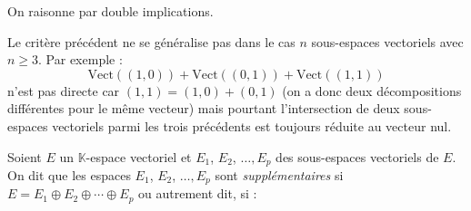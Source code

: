\documentclass[a4paper,10pt]{report}
\begin{document}
 \begin{Demonstration}{} On raisonne par double implications.
% 
% 
%

\vspace{8cm}
\end{Demonstration}

\begin{Remarque}{} Le critère précédent ne se généralise pas dans le cas $n$ sous-espaces vectoriels avec $n \geq 3$. Par exemple :
$$ \textrm{Vect}((1,0)) + \textrm{Vect}((0,1)) + \textrm{Vect}((1,1)) $$
n'est pas directe car $(1,1)= (1,0) + (0,1)$ (on a donc deux décompositions différentes pour le même vecteur) mais pourtant l'intersection de deux sous-espaces vectoriels parmi les trois précédents est toujours réduite au vecteur nul.
\end{Remarque}


\begin{Definition}{}
Soient $E$ un $\mathbb{K}$-espace vectoriel et $E_1$, $E_2$, $\ldots, E_p$ des sous-espaces vectoriels de $E$.  On dit que les espaces $E_1$, $E_2$, $\ldots, E_p$ sont \emph{supplémentaires} si $E = E_1 \oplus E_2 \oplus \cdots \oplus E_p$ ou autrement dit, si :
\vspace{1cm}
\end{Definition}
\medskip
\end{document}
